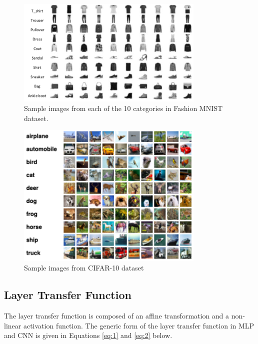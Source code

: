 \documentclass[wcp]{jmlr}
\begin{document}
\begin{figure}[htp]
\begin{center}
\includegraphics[width=0.8\textwidth]{images/fashionmnist.png}
\caption{Sample images from each of the 10 categories in Fashion MNIST dataset.}\label{fig:fashionmnist}
\end{center}
\end{figure}

\begin{figure}[htp]
\begin{center}
\includegraphics[width=0.8\textwidth]{images/Cifar10.png}
\caption{Sample images from CIFAR-10 dataset}\label{fig:cifar10}
\end{center}
\end{figure}

\subsection{Layer Transfer Function}
The layer transfer function is composed of an affine transformation and a non-linear activation function. The generic form of the layer transfer function in MLP and CNN is given in Equations \ref{eq:1} and \ref{eq:2} below.
\end{document}

